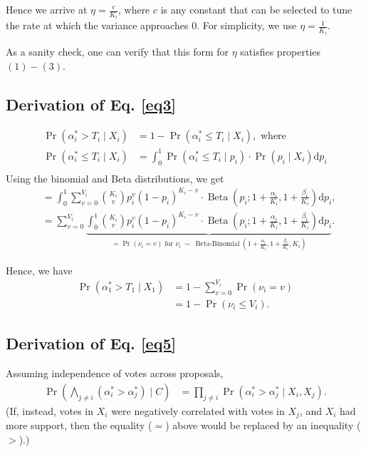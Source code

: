 \documentclass[chi_draft]{sigchi}
\begin{document}
Hence we arrive at $\eta = \frac{c}{K_i}$, where $c$ is any constant that can be selected to tune the rate at which the variance approaches $0$.  For simplicity, we use $\eta = \frac{1}{K_i}$.

As a sanity check, one can verify that this form for $\eta$ satisfies properties $(1)-(3)$.

\subsection{Derivation of Eq. \eqref{eq3}}
\begin{align*}
\Pr(\alpha^*_i > T_i \mid X_i) &= 1 - \Pr(\alpha^*_i \leq T_i \mid X_i), \text{ where}\\
\Pr(\alpha^*_i \leq T_i \mid X_i) &= \int_0^1 \Pr(\alpha^*_i \leq T_i \mid p_i)\cdot \Pr(p_i \mid X_i) \mathrm{d}p_i\\
\end{align*}
Using the binomial and Beta distributions, we get
\begin{align*}
&= \int_0^1 \sum\limits_{v=0}^{V_i} {K_i \choose v} p_i^{v} {(1-p_i)}^{K_i-v} \cdot \operatorname{Beta}(p_i; 1+\frac{\alpha_i}{K_i},1+\frac{\beta_i}{K_i}) \mathrm{d}p_i,\\
&= \sum\limits_{v=0}^{V_i} \underbrace{\int_0^1 {K_i \choose v} p_i^{v} {(1-p_i)}^{K_i-v} \cdot \operatorname{Beta}(p_i; 1+\frac{\alpha_i}{K_i},1+\frac{\beta_i}{K_i}) \mathrm{d}p_i}_{= \Pr(\nu_i = v)\text{ for } \nu_i\ \sim\ \operatorname{Beta-Binomial}(1+\frac{\alpha_i}{K_i},1+\frac{\beta_i}{K_i}, K_i)}.
\end{align*}

Hence, we have
\begin{align*}
\Pr(\alpha^*_1 > T_1 \mid X_1) &= 1 - \sum\limits_{v=0}^{V_i} \Pr(\nu_i = v)\\
&= 1 - \Pr(\nu_i \leq V_i).
\end{align*}

\subsection{Derivation of Eq. \eqref{eq5}}
Assuming independence of votes across proposals,
\begin{align*}
\Pr\left(\bigwedge_{j \neq i} (\alpha^*_i > \alpha^*_j) \mid C\right) &=\prod_{j \neq i} \Pr(\alpha^*_i > \alpha^*_j \mid X_i, X_j).
\end{align*}
(If, instead, votes in $X_i$ were negatively correlated with votes in $X_j$, and $X_i$ had more support, then the equality ($=$) above would be replaced by an inequality ($>$).)
\end{document}
